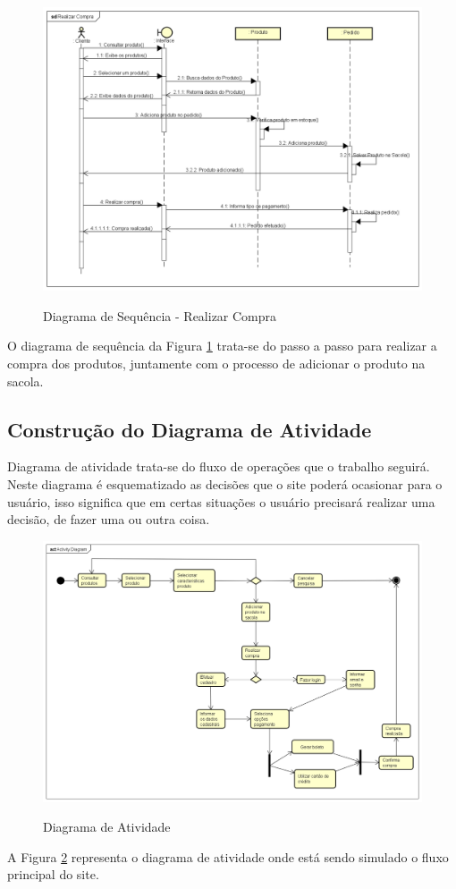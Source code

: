 \begin{figure}[H]
    \centering
    \caption{Diagrama de Sequência - Realizar Compra}
    \includegraphics[width=1.0\textwidth]{./dados/figuras/9}
    \label{fig:figura-8}
\end{figure}
O diagrama de sequência da Figura \ref{fig:figura-8} trata-se do passo a passo para realizar a compra dos produtos, juntamente com o processo de adicionar o produto na sacola.

\subsection{Construção do Diagrama de Atividade}
\label{sec:diaati}
Diagrama de atividade trata-se do fluxo de operações que o trabalho seguirá. Neste diagrama é esquematizado as decisões que o site poderá ocasionar para o usuário, isso significa que em certas situações o usuário precisará realizar uma decisão, de fazer uma ou outra coisa.

\begin{figure}[H]
    \centering
    \caption{Diagrama de Atividade}
    \includegraphics[width=1.0\textwidth]{./dados/figuras/6}
    \label{fig:figura-9}
\end{figure}

A Figura \ref{fig:figura-9} representa o diagrama de atividade onde está sendo simulado o fluxo principal do site. 
